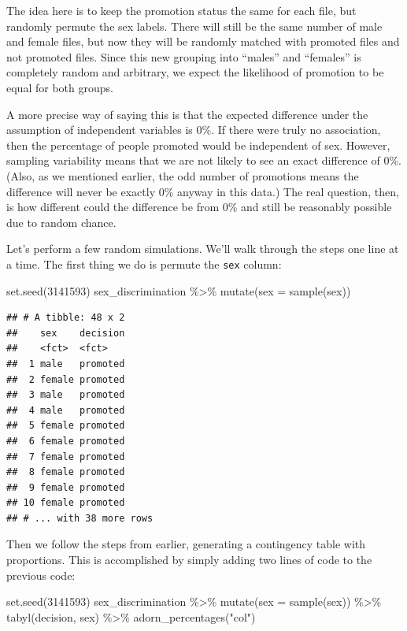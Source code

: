 \documentclass[
]{book}
\newenvironment{Shaded}{\begin{snugshade}}{\end{snugshade}}
\newcommand{\AttributeTok}[1]{\textcolor[rgb]{0.77,0.63,0.00}{#1}}
\newcommand{\DecValTok}[1]{\textcolor[rgb]{0.00,0.00,0.81}{#1}}
\newcommand{\FunctionTok}[1]{\textcolor[rgb]{0.00,0.00,0.00}{#1}}
\newcommand{\NormalTok}[1]{#1}
\newcommand{\SpecialCharTok}[1]{\textcolor[rgb]{0.00,0.00,0.00}{#1}}
\newcommand{\StringTok}[1]{\textcolor[rgb]{0.31,0.60,0.02}{#1}}
\begin{document}
The idea here is to keep the promotion status the same for each file, but randomly permute the sex labels. There will still be the same number of male and female files, but now they will be randomly matched with promoted files and not promoted files. Since this new grouping into ``males'' and ``females'' is completely random and arbitrary, we expect the likelihood of promotion to be equal for both groups.

A more precise way of saying this is that the expected difference under the assumption of independent variables is 0\%. If there were truly no association, then the percentage of people promoted would be independent of sex. However, sampling variability means that we are not likely to see an exact difference of 0\%. (Also, as we mentioned earlier, the odd number of promotions means the difference will never be exactly 0\% anyway in this data.) The real question, then, is how different could the difference be from 0\% and still be reasonably possible due to random chance.

Let's perform a few random simulations. We'll walk through the steps one line at a time. The first thing we do is permute the \texttt{sex} column:

\begin{Shaded}
\begin{Highlighting}[]
\FunctionTok{set.seed}\NormalTok{(}\DecValTok{3141593}\NormalTok{)}
\NormalTok{sex\_discrimination }\SpecialCharTok{\%\textgreater{}\%}
    \FunctionTok{mutate}\NormalTok{(}\AttributeTok{sex =} \FunctionTok{sample}\NormalTok{(sex))}
\end{Highlighting}
\end{Shaded}

\begin{verbatim}
## # A tibble: 48 x 2
##    sex    decision
##    <fct>  <fct>   
##  1 male   promoted
##  2 female promoted
##  3 male   promoted
##  4 male   promoted
##  5 female promoted
##  6 female promoted
##  7 female promoted
##  8 female promoted
##  9 female promoted
## 10 female promoted
## # ... with 38 more rows
\end{verbatim}

Then we follow the steps from earlier, generating a contingency table with proportions. This is accomplished by simply adding two lines of code to the previous code:

\begin{Shaded}
\begin{Highlighting}[]
\FunctionTok{set.seed}\NormalTok{(}\DecValTok{3141593}\NormalTok{)}
\NormalTok{sex\_discrimination }\SpecialCharTok{\%\textgreater{}\%}
    \FunctionTok{mutate}\NormalTok{(}\AttributeTok{sex =} \FunctionTok{sample}\NormalTok{(sex)) }\SpecialCharTok{\%\textgreater{}\%}
    \FunctionTok{tabyl}\NormalTok{(decision, sex) }\SpecialCharTok{\%\textgreater{}\%}
    \FunctionTok{adorn\_percentages}\NormalTok{(}\StringTok{"col"}\NormalTok{)}
\end{Highlighting}
\end{Shaded}
\end{document}
